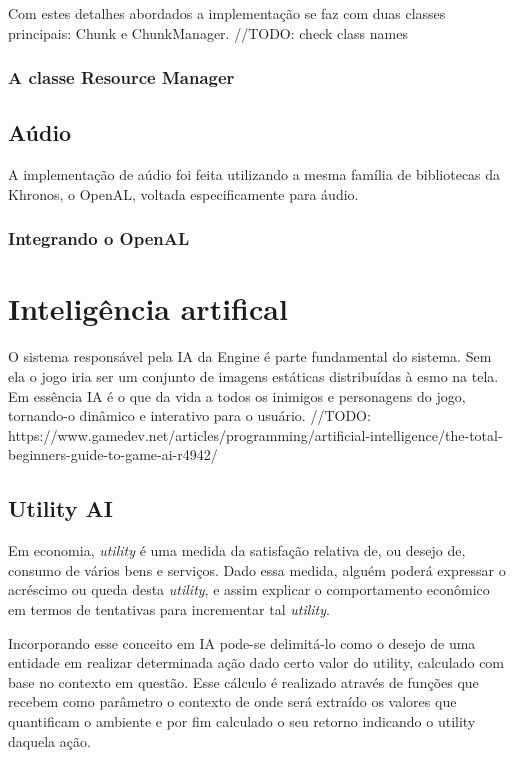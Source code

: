\documentclass[12pt, 
openright, 
oneside, 
a4paper,    
brazil]{facom-ufu-abntex2}
\begin{document}
Com estes detalhes abordados a implementação se faz com duas classes principais: Chunk e ChunkManager. //TODO: check class names

\subsection{A classe Resource Manager}

\section{Aúdio}
A implementação de aúdio foi feita utilizando a mesma família de bibliotecas da Khronos, o OpenAL, voltada especificamente para áudio.

\subsection{Integrando o OpenAL}

\chapter{Inteligência artifical}
O sistema responsável pela IA da Engine é parte fundamental do sistema. Sem ela o jogo iria ser um conjunto de imagens estáticas distribuídas à esmo na tela.
Em essência IA é o que da vida a todos os inimigos e personagens do jogo, tornando-o dinâmico e interativo para o usuário.
//TODO: https://www.gamedev.net/articles/programming/artificial-intelligence/the-total-beginners-guide-to-game-ai-r4942/ 

\section{Utility AI}

Em economia, \textit{utility} é uma medida da satisfação relativa de, ou desejo de, consumo de vários bens e serviços. Dado essa medida, alguém poderá expressar o acréscimo ou queda desta \textit{utility}, e assim explicar o comportamento econômico em termos de tentativas para incrementar tal \textit{utility}.

Incorporando esse conceito em IA pode-se delimitá-lo como o desejo de uma entidade em realizar determinada ação dado certo valor do utility, calculado com base no contexto em questão. Esse cálculo é realizado através de funções que recebem como parâmetro o contexto de onde será extraído os valores que quantificam o ambiente e por fim calculado o seu retorno indicando o utility daquela ação.
\end{document}
